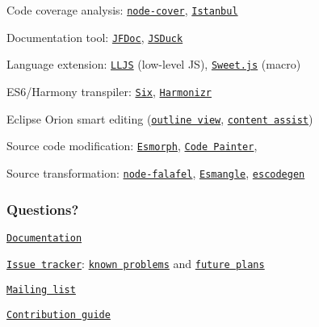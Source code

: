 \begin{DoxyItemize}
\item Code coverage analysis\+: \href{https://github.com/itay/node-cover}{\tt node-\/cover}, \href{https://github.com/yahoo/Istanbul}{\tt Istanbul}
\item Documentation tool\+: \href{https://github.com/thejohnfreeman/jfdoc}{\tt J\+F\+Doc}, \href{https://github.com/senchalabs/jsduck}{\tt J\+S\+Duck}
\item Language extension\+: \href{http://mbebenita.github.com/LLJS/}{\tt L\+L\+J\+S} (low-\/level J\+S), \href{http://sweetjs.org/}{\tt Sweet.\+js} (macro)
\item E\+S6/\+Harmony transpiler\+: \href{https://github.com/matthewrobb/six}{\tt Six}, \href{https://github.com/jdiamond/harmonizr}{\tt Harmonizr}
\item Eclipse Orion smart editing (\href{https://github.com/aclement/esprima-outline}{\tt outline view}, \href{http://contraptionsforprogramming.blogspot.com/2012/02/better-javascript-content-assist-in.html}{\tt content assist})
\item Source code modification\+: \href{https://github.com/ariya/esmorph}{\tt Esmorph}, \href{https://github.com/fawek/codepainter}{\tt Code Painter},
\item Source transformation\+: \href{https://github.com/substack/node-falafel}{\tt node-\/falafel}, \href{https://github.com/Constellation/esmangle}{\tt Esmangle}, \href{https://github.com/Constellation/escodegen}{\tt escodegen}
\end{DoxyItemize}

\subsubsection*{Questions?}


\begin{DoxyItemize}
\item \href{http://esprima.org/doc}{\tt Documentation}
\item \href{http://issues.esprima.org}{\tt Issue tracker}\+: \href{http://code.google.com/p/esprima/issues/list?q=Defect}{\tt known problems} and \href{http://code.google.com/p/esprima/issues/list?q=Enhancement}{\tt future plans}
\item \href{http://groups.google.com/group/esprima}{\tt Mailing list}
\item \href{http://esprima.org/doc/index.html#contribution}{\tt Contribution guide}
\end{DoxyItemize}

